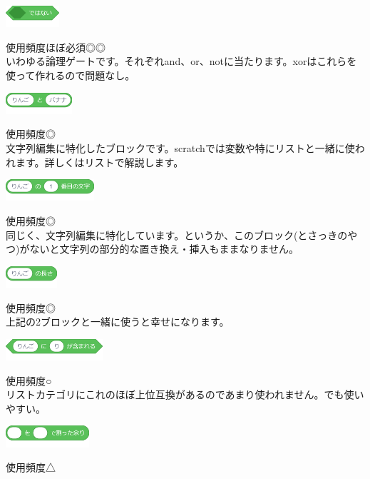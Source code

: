 \documentclass[b5paper,10pt]{jsarticle}
\begin{document}
\begin{multicols*}{3}
\begin{itembox}{5}
\includegraphics[height=8mm]{images/operators_11.png}
\end{itembox}
使用頻度ほぼ必須◎◎\\
いわゆる論理ゲートです。それぞれand、or、notに当たります。xorはこれらを使って作れるので問題なし。
\begin{itembox}{6}
\includegraphics[height=8mm]{images/operators_12.png}
\end{itembox}
使用頻度◎\\
文字列編集に特化したブロックです。scratchでは変数や特にリストと一緒に使われます。詳しくはリストで解説します。
\begin{itembox}{7}
\includegraphics[height=8mm]{images/operators_13.png}
\end{itembox}
使用頻度◎\\
同じく、文字列編集に特化しています。というか、このブロック(とさっきのやつ)がないと文字列の部分的な置き換え・挿入もままなりません。
\begin{itembox}{8}
\includegraphics[height=8mm]{images/operators_14.png}
\end{itembox}
使用頻度◎\\
上記の2ブロックと一緒に使うと幸せになります。
\begin{itembox}{9}
\includegraphics[height=8mm]{images/operators_15.png}
\end{itembox}
使用頻度○\\
リストカテゴリにこれのほぼ上位互換があるのであまり使われません。でも使いやすい。
\begin{itembox}{10}
\includegraphics[height=8mm]{images/operators_16.png}
\end{itembox}
使用頻度△\\

\end{multicols*}
\end{document}
